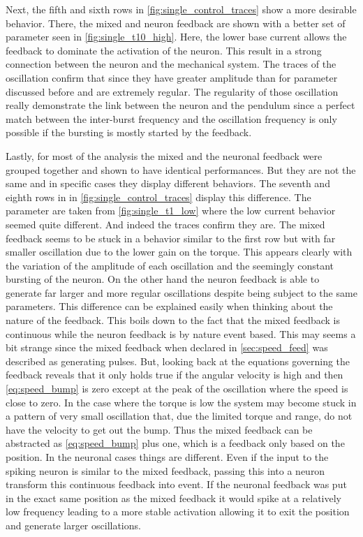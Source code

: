 Next, the fifth and sixth rows in \cref{fig:single_control_traces} show a more desirable behavior. There, the mixed and neuron feedback are shown with a better set of parameter seen in \cref{fig:single_t10_high}. Here, the lower base current allows the feedback to dominate the activation of the neuron. This result in a strong connection  between the neuron and the mechanical system. The traces of the oscillation confirm that since they have greater amplitude than for parameter discussed before and are extremely regular. The regularity of those oscillation really demonstrate the link between the neuron and the pendulum since a perfect match between the inter-burst frequency and the oscillation frequency is only possible if the bursting is mostly started by the feedback.

Lastly, for most of the analysis the mixed and the neuronal feedback were grouped together and shown to have identical performances. But they are not the same and in specific cases they display different behaviors. The seventh and eighth rows in in \cref{fig:single_control_traces} display this difference. The parameter are taken from \cref{fig:single_t1_low} where the low current behavior seemed quite different. And indeed the traces confirm they are. The mixed feedback seems to be stuck in a behavior similar to the first row but with far smaller oscillation due to the lower gain on the torque. This appears clearly with the variation of the amplitude of each oscillation and the seemingly constant bursting of the neuron. On the other hand the neuron feedback is able to generate far larger and more regular oscillations despite being subject to the same parameters. This difference can be explained easily when thinking about the nature of the feedback. This boils down to the fact that the mixed feedback is continuous while the neuron feedback is by nature event based. This may seems a  bit strange since the mixed feedback when declared in \cref{sec:speed_feed} was described as generating pulses. But, looking back at the equations governing the feedback reveals that it only holds true if the angular velocity is high and then \cref{eq:speed_bump} is zero except at the peak of the oscillation where the speed is close to zero. In the case where the torque is low the system may become stuck in a pattern of very small oscillation that, due the limited torque and range, do not have the velocity to get out the bump. Thus the mixed feedback can be abstracted as \cref{eq:speed_bump} plus one, which is a feedback only based on the position. In the neuronal cases things are different. Even if the input to the spiking neuron is similar to the mixed feedback, passing this into a neuron transform this continuous feedback into event. If the neuronal feedback was put in the exact same position as the mixed feedback it would spike at a relatively low frequency leading to a more stable activation allowing it to exit the position and generate larger oscillations.

